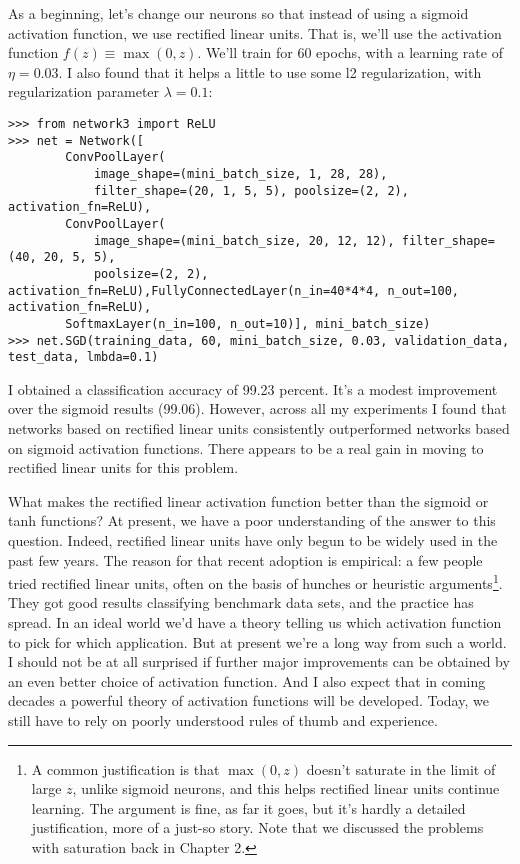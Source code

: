 \documentclass[a4paper,twoside,10pt]{book}
\begin{document}
As a beginning, let's change our neurons so that instead of using a sigmoid activation function, we use rectified linear units. That is, we'll use the activation function $f(z)\equiv\max(0,z)$. We'll train for 60 epochs, with a learning rate of $\eta=0.03$. I also found that it helps a little to use some l2 regularization, with regularization parameter $\lambda=0.1$:
\begin{lstlisting}
>>> from network3 import ReLU
>>> net = Network([
		ConvPoolLayer(
			image_shape=(mini_batch_size, 1, 28, 28), 
			filter_shape=(20, 1, 5, 5), poolsize=(2, 2), activation_fn=ReLU),
		ConvPoolLayer(
			image_shape=(mini_batch_size, 20, 12, 12), filter_shape=(40, 20, 5, 5), 
			poolsize=(2, 2), activation_fn=ReLU),FullyConnectedLayer(n_in=40*4*4, n_out=100, activation_fn=ReLU),
		SoftmaxLayer(n_in=100, n_out=10)], mini_batch_size)
>>> net.SGD(training_data, 60, mini_batch_size, 0.03, validation_data, test_data, lmbda=0.1)

\end{lstlisting}
I obtained a classification accuracy of 99.23 percent. It's a modest improvement over the sigmoid results (99.06). However, across all my experiments I found that networks based on rectified linear units consistently outperformed networks based on sigmoid activation functions. There appears to be a real gain in moving to rectified linear units for this problem.

What makes the rectified linear activation function better than the sigmoid or tanh functions? At present, we have a poor understanding of the answer to this question. Indeed, rectified linear units have only begun to be widely used in the past few years. The reason for that recent adoption is empirical: a few people tried rectified linear units, often on the basis of hunches or heuristic arguments\footnote{A common justification is that $\max(0,z)$ doesn't saturate in the limit of large $z$, unlike sigmoid neurons, and this helps rectified linear units continue learning. The argument is fine, as far it goes, but it's hardly a detailed justification, more of a just-so story. Note that we discussed the problems with saturation back in Chapter 2.}. They got good results classifying benchmark data sets, and the practice has spread. In an ideal world we'd have a theory telling us which activation function to pick for which application. But at present we're a long way from such a world. I should not be at all surprised if further major improvements can be obtained by an even better choice of activation function. And I also expect that in coming decades a powerful theory of activation functions will be developed. Today, we still have to rely on poorly understood rules of thumb and experience.
\end{document}
